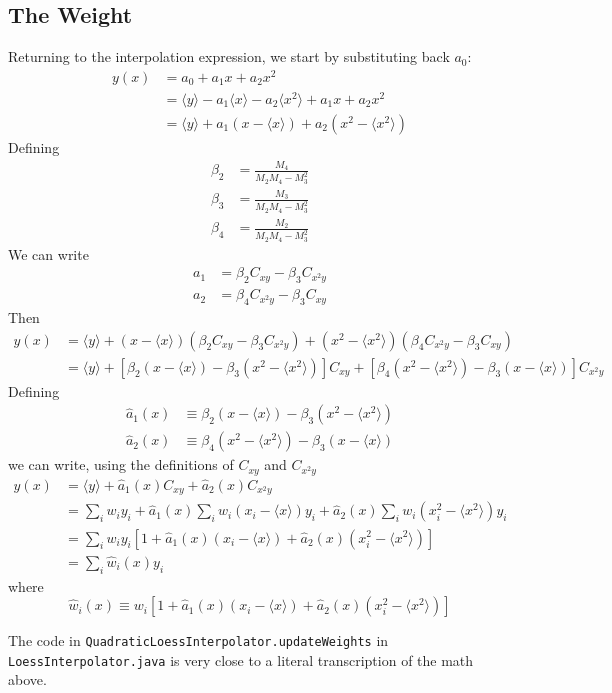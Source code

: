 \documentclass[oneside]{tufte-handout}
\newcommand\code[1]{\texttt{#1}}
\begin{document}
\begin{fullwidth}
\subsection{The Weight}
Returning to the interpolation expression, we start by substituting back $a_0$:
\begin{align*}
y(x) &= a_0 + a_1 x + a_2 x^2 \\
     &= \langle y \rangle - a_1 \langle x \rangle - a_2 \langle x^2 \rangle + a_1 x + a_2 x^2 \\
     &= \langle y \rangle + a_1 (x - \langle x \rangle) + a_2 (x^2 - \langle x^2 \rangle)
\end{align*}
Defining
\begin{align*}
\beta_2 &= \frac{M_4}{M_2 M_4 - M_3^2} \\
\beta_3 &= \frac{M_3}{M_2 M_4 - M_3^2}\\
\beta_4 &= \frac{M_2}{M_2 M_4 - M_3^2}
\end{align*}
We can write
\begin{align*}
a_1 &= \beta_2 C_{xy} - \beta_3 C_{x^2 y} \\
a_2 &= \beta_4 C_{x^2y} - \beta_3 C_{xy}
\end{align*}
Then
\begin{align*}
y(x) &= \langle y \rangle + (x - \langle x \rangle)(\beta_2 C_{xy} - \beta_3 C_{x^2 y}) 
       + (x^2 - \langle x^2 \rangle)(\beta_4 C_{x^2y} - \beta_3 C_{xy}) \\
       &= \langle y \rangle  + [\beta_2(x - \langle x \rangle) - \beta_3 (x^2 - \langle x^2 \rangle)] C_{xy}
       + [\beta_4(x^2 - \langle x^2 \rangle) - \beta_3 (x - \langle x \rangle)] C_{x^2y}
\end{align*}
Defining
\begin{align*}
\hat{a}_1(x) &\equiv \beta_2(x - \langle x \rangle) - \beta_3 (x^2 - \langle x^2 \rangle) \\
\hat{a}_2(x) &\equiv \beta_4(x^2 - \langle x^2 \rangle) - \beta_3 (x - \langle x \rangle)
\end{align*}
we can write, using the definitions of $C_{xy}$ and $C_{x^2y}$
\begin{align*}
y(x) &= \langle y \rangle + \hat{a}_1(x) C_{xy} + \hat{a}_2(x) C_{x^2y} \\
     &= \sum_i w_i y_i + \hat{a}_1(x)  \sum_i w_i (x_i - \langle x \rangle) y_i 
         + \hat{a}_2(x) \sum_i w_i (x_i^2 - \langle x^2 \rangle) y_i \\
     &= \sum_i w_i y_i \left[1 + \hat{a}_1(x) (x_i - \langle x \rangle) 
         + \hat{a}_2(x) (x_i^2 - \langle x^2 \rangle)\right] \\
     &= \sum_i \hat{w}_i(x) y_i
\end{align*}
where
\begin{equation*}
    \hat{w}_i(x) \equiv w_i \left[1 + \hat{a}_1(x) (x_i - \langle x \rangle) 
         + \hat{a}_2(x) (x_i^2 - \langle x^2 \rangle)\right]
\end{equation*}

The code in \code{QuadraticLoessInterpolator.updateWeights} in \code{LoessInterpolator.java} is very close to a literal transcription of the math above.


\end{fullwidth}
\end{document}
